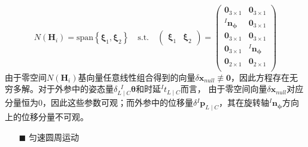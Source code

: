 \begin{equation}
  N(\boldsymbol{H}_i)=\mathrm{span}\left\lbrace
  \boldsymbol{\xi}_1,\boldsymbol{\xi}_2
  \right\rbrace
  \quad\mathrm{s.t.}\quad
  \begin{pmatrix}
    \boldsymbol{\xi}_1 & \boldsymbol{\xi}_2
  \end{pmatrix}=
  \begin{pmatrix}
    \boldsymbol{0}_{3\times 1}               & \boldsymbol{0}_{3\times 1}               \\
    {^{I}\boldsymbol{n}_{\boldsymbol{\phi}}} & \boldsymbol{0}_{3\times 1}               \\
    \boldsymbol{0}_{3\times 1}               & \boldsymbol{0}_{3\times 1}               \\
    \boldsymbol{0}_{3\times 1}               & {^{I}\boldsymbol{n}_{\boldsymbol{\phi}}} \\
    \boldsymbol{0}_{2\times 1}               & \boldsymbol{0}_{2\times 1}               \\
  \end{pmatrix}
\end{equation}
由于零空间$N(\boldsymbol{H}_i)$基向量任意线性组合得到的向量$\delta\boldsymbol{x}_{null}\not\equiv\boldsymbol{0}$，因此方程存在无穷多解。对于外参中的姿态量$\delta {^{\;\;I}_{L\mid C}\boldsymbol{\theta}}$和时延${^{I}t_{L\mid C}}$而言，
由于零空间向量$\delta\boldsymbol{x}_{null}$对应分量恒为0，因此这些参数可观；而外参中的位移量$\delta {^{I}\boldsymbol{p}_{L\mid C}}$，其在旋转轴${^{I}\boldsymbol{n}_{\boldsymbol{\phi}}}$方向上的位移分量不可观。

\begin{itemize}
  \item[$\blacksquare$]匀速圆周运动
\end{itemize}

